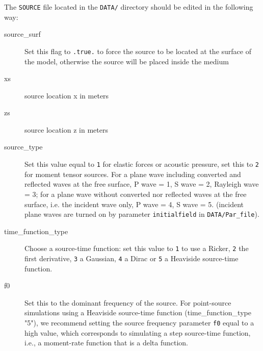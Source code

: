 \documentclass[oneside,english,onecolumn,letterpaper]{book}
\begin{document}
\noindent
The \texttt{SOURCE} file located in the \texttt{DATA/} directory should be edited in the following way:
\begin{description}
\item[source\_surf] Set this flag to \texttt{.true.} to force the source to be located at the surface of the model, otherwise
the source will be placed inside the medium

\item[xs] source location x in meters

\item[zs] source location z in meters

\item[source\_type] Set this value equal to \texttt{1} for elastic forces or acoustic pressure,
set this to \texttt{2} for moment tensor sources.
For a plane wave including converted and reflected waves at the free surface, P wave = 1, S wave = 2, Rayleigh wave = 3;
for a plane wave without converted nor reflected waves at the free surface, i.e. the incident wave only, P wave = 4, S wave = 5.
(incident plane waves are turned on by parameter \texttt{initialfield} in \texttt{DATA/Par\_file}).

\item[time\_function\_type] Choose a source-time function: set this value to \texttt{1} to use a Ricker,
\texttt{2} the first derivative, \texttt{3} a Gaussian, \texttt{4} a Dirac or \texttt{5} a Heaviside source-time function.

\item[f0] Set this to the dominant frequency of the source.
For point-source simulations using a Heaviside source-time function (time\_function\_type "5"),
we recommend setting the source frequency parameter \texttt{f0}
equal to a high value, which corresponds to simulating a step source-time
function, i.e., a moment-rate function that is a delta function.


\end{description}
\end{document}
